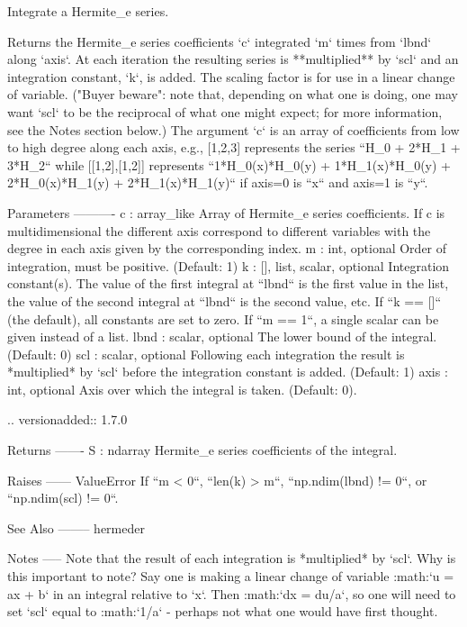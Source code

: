\begin{DoxyVerb}Integrate a Hermite_e series.

Returns the Hermite_e series coefficients `c` integrated `m` times from
`lbnd` along `axis`. At each iteration the resulting series is
**multiplied** by `scl` and an integration constant, `k`, is added.
The scaling factor is for use in a linear change of variable.  ("Buyer
beware": note that, depending on what one is doing, one may want `scl`
to be the reciprocal of what one might expect; for more information,
see the Notes section below.)  The argument `c` is an array of
coefficients from low to high degree along each axis, e.g., [1,2,3]
represents the series ``H_0 + 2*H_1 + 3*H_2`` while [[1,2],[1,2]]
represents ``1*H_0(x)*H_0(y) + 1*H_1(x)*H_0(y) + 2*H_0(x)*H_1(y) +
2*H_1(x)*H_1(y)`` if axis=0 is ``x`` and axis=1 is ``y``.

Parameters
----------
c : array_like
    Array of Hermite_e series coefficients. If c is multidimensional
    the different axis correspond to different variables with the
    degree in each axis given by the corresponding index.
m : int, optional
    Order of integration, must be positive. (Default: 1)
k : {[], list, scalar}, optional
    Integration constant(s).  The value of the first integral at
    ``lbnd`` is the first value in the list, the value of the second
    integral at ``lbnd`` is the second value, etc.  If ``k == []`` (the
    default), all constants are set to zero.  If ``m == 1``, a single
    scalar can be given instead of a list.
lbnd : scalar, optional
    The lower bound of the integral. (Default: 0)
scl : scalar, optional
    Following each integration the result is *multiplied* by `scl`
    before the integration constant is added. (Default: 1)
axis : int, optional
    Axis over which the integral is taken. (Default: 0).

    .. versionadded:: 1.7.0

Returns
-------
S : ndarray
    Hermite_e series coefficients of the integral.

Raises
------
ValueError
    If ``m < 0``, ``len(k) > m``, ``np.ndim(lbnd) != 0``, or
    ``np.ndim(scl) != 0``.

See Also
--------
hermeder

Notes
-----
Note that the result of each integration is *multiplied* by `scl`.
Why is this important to note?  Say one is making a linear change of
variable :math:`u = ax + b` in an integral relative to `x`.  Then
:math:`dx = du/a`, so one will need to set `scl` equal to
:math:`1/a` - perhaps not what one would have first thought.


\end{DoxyVerb}
